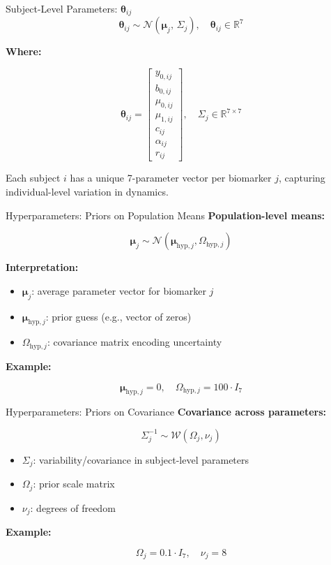 \documentclass[
  ignorenonframetext,
]{beamer}
\providecommand{\tightlist}{%
  \setlength{\itemsep}{0pt}\setlength{\parskip}{0pt}}\usepackage{longtable,booktabs,array}
\begin{document}
\begin{frame}{Subject-Level Parameters: \(\boldsymbol{\theta}_{ij}\)}
\label{subject-level-parameters-boldsymboltheta_ij}
\[
\boldsymbol{\theta}_{ij} \sim \mathcal{N}(\boldsymbol{\mu}_j,\,\Sigma_j),
\quad \boldsymbol{\theta}_{ij} \in \mathbb{R}^7
\]

\textbf{Where:}

\[
\boldsymbol{\theta}_{ij} = 
\begin{bmatrix}
y_{0,ij} \\
b_{0,ij} \\
\mu_{0,ij} \\
\mu_{1,ij} \\
c_{ij} \\
\alpha_{ij} \\
r_{ij}
\end{bmatrix},
\quad \Sigma_j \in \mathbb{R}^{7 \times 7}
\]

Each subject \(i\) has a unique 7-parameter vector per biomarker \(j\),
capturing individual-level variation in dynamics.
\end{frame}

\begin{frame}{Hyperparameters: Priors on Population Means}
\label{hyperparameters-priors-on-population-means}
\textbf{Population-level means:}

\[
\boldsymbol{\mu}_j \sim \mathcal{N}(\boldsymbol{\mu}_{\mathrm{hyp},j}, \Omega_{\mathrm{hyp},j})
\]

\textbf{Interpretation:}

\begin{itemize}
\tightlist
\item
  \(\boldsymbol{\mu}_j\): average parameter vector for biomarker \(j\)
\item
  \(\boldsymbol{\mu}_{\mathrm{hyp},j}\): prior guess (e.g., vector of
  zeros)
\item
  \(\Omega_{\mathrm{hyp},j}\): covariance matrix encoding uncertainty
\end{itemize}

\textbf{Example:}

\[
\boldsymbol{\mu}_{\mathrm{hyp},j} = 0, \quad \Omega_{\mathrm{hyp},j} = 100 \cdot I_7
\]
\end{frame}

\begin{frame}{Hyperparameters: Priors on Covariance}
\label{hyperparameters-priors-on-covariance}
\textbf{Covariance across parameters:}

\[
\Sigma_j^{-1} \sim \mathcal{W}(\Omega_j, \nu_j)
\]

\begin{itemize}
\tightlist
\item
  \(\Sigma_j\): variability/covariance in subject-level parameters
\item
  \(\Omega_j\): prior scale matrix
\item
  \(\nu_j\): degrees of freedom
\end{itemize}

\textbf{Example:}

\[
\Omega_j = 0.1 \cdot I_7, \quad \nu_j = 8
\]
\end{frame}
\end{document}
